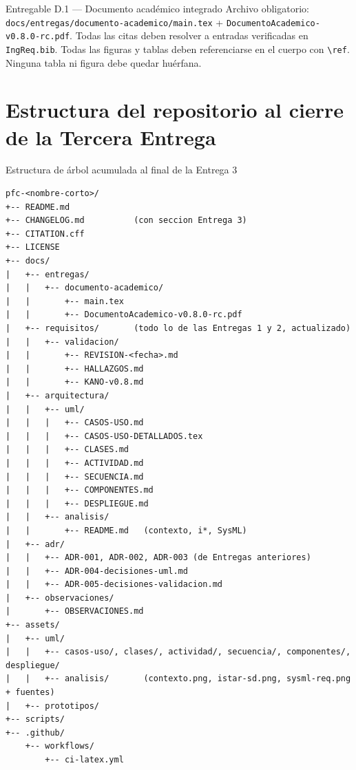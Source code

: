 \documentclass[11pt,a4paper]{article}
\begin{document}
\begin{cajaentregable}{Entregable D.1 --- Documento acad\'emico integrado}
Archivo obligatorio: \texttt{docs/entregas/documento-academico/main.tex} + \texttt{DocumentoAcademico-v0.8.0-rc.pdf}. Todas las citas deben resolver a entradas verificadas en \texttt{IngReq.bib}. Todas las figuras y tablas deben referenciarse en el cuerpo con \texttt{\textbackslash ref}. Ninguna tabla ni figura debe quedar hu\'erfana.
\end{cajaentregable}

\section{Estructura del repositorio al cierre de la Tercera Entrega}

\begin{cajarepo}{Estructura de \'arbol acumulada al final de la Entrega 3}
\begin{lstlisting}
pfc-<nombre-corto>/
+-- README.md
+-- CHANGELOG.md          (con seccion Entrega 3)
+-- CITATION.cff
+-- LICENSE
+-- docs/
|   +-- entregas/
|   |   +-- documento-academico/
|   |       +-- main.tex
|   |       +-- DocumentoAcademico-v0.8.0-rc.pdf
|   +-- requisitos/       (todo lo de las Entregas 1 y 2, actualizado)
|   |   +-- validacion/
|   |       +-- REVISION-<fecha>.md
|   |       +-- HALLAZGOS.md
|   |       +-- KANO-v0.8.md
|   +-- arquitectura/
|   |   +-- uml/
|   |   |   +-- CASOS-USO.md
|   |   |   +-- CASOS-USO-DETALLADOS.tex
|   |   |   +-- CLASES.md
|   |   |   +-- ACTIVIDAD.md
|   |   |   +-- SECUENCIA.md
|   |   |   +-- COMPONENTES.md
|   |   |   +-- DESPLIEGUE.md
|   |   +-- analisis/
|   |       +-- README.md   (contexto, i*, SysML)
|   +-- adr/
|   |   +-- ADR-001, ADR-002, ADR-003 (de Entregas anteriores)
|   |   +-- ADR-004-decisiones-uml.md
|   |   +-- ADR-005-decisiones-validacion.md
|   +-- observaciones/
|       +-- OBSERVACIONES.md
+-- assets/
|   +-- uml/
|   |   +-- casos-uso/, clases/, actividad/, secuencia/, componentes/, despliegue/
|   |   +-- analisis/       (contexto.png, istar-sd.png, sysml-req.png + fuentes)
|   +-- prototipos/
+-- scripts/
+-- .github/
    +-- workflows/
        +-- ci-latex.yml
\end{lstlisting}
\end{cajarepo}

\end{document}
